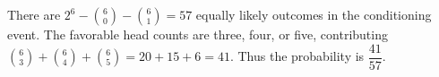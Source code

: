 There are $2^6-\binom60-\binom61=57$ equally likely outcomes in the conditioning event. The favorable head counts are three, four, or five, contributing $\binom63+\binom64+\binom65=20+15+6=41$. Thus the probability is $\boxed{\dfrac{41}{57}}$.
